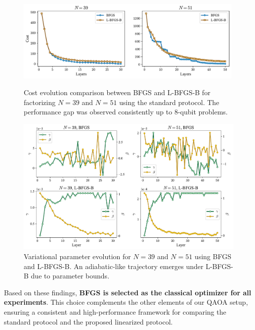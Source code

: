 \begin{figure}[h]
    \centering
    \includegraphics[width=0.99\textwidth]{03-methodology/figs/optimizer_comparison.pdf}
    \caption{Cost evolution comparison between BFGS and L-BFGS-B for factorizing $N=39$ and $N=51$ using the standard protocol. The performance gap was observed consistently up to 8-qubit problems.}
    \label{fig:optimizer_comparison}
    \includegraphics[width=1\textwidth]{03-methodology/figs/optimizer_parameters_comparison.pdf}
    \caption{Variational parameter evolution for $N=39$ and $N=51$ using BFGS and L-BFGS-B. An adiabatic-like trajectory emerges under L-BFGS-B due to parameter bounds.}
    \label{fig:optimizer_parameter_comparison}
\end{figure}

Based on these findings, \textbf{BFGS is selected as the classical optimizer for all experiments}.  
This choice complements the other elements of our QAOA setup, ensuring a consistent and high-performance framework for comparing the standard protocol and the proposed linearized protocol.